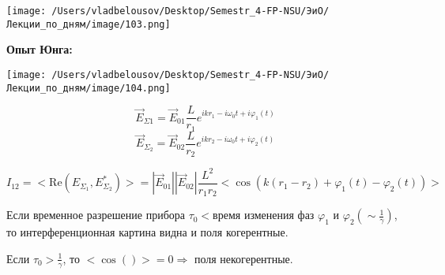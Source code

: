 \documentclass[12pt, a4paper]{report}
\begin{document}
\begin{center}
    \texttt{[image: /Users/vladbelousov/Desktop/Semestr\_4-FP-NSU/ЭиО/Лекции\_по\_дням/image/103.png]}
\end{center} 

\textbf{Опыт Юнга: } 

\begin{center}
    \texttt{[image: /Users/vladbelousov/Desktop/Semestr\_4-FP-NSU/ЭиО/Лекции\_по\_дням/image/104.png]}
\end{center} 

\[ \vec{E }  _{\Sigma 1 } = \vec{E }  _{01 }  \frac{L}{r_1 } e^{ i k r_1 - i \omega_0 t + i \varphi_1 (t )}    \] 
\[ \vec{E } _{\Sigma_2 } = \vec{E }  _{02 }  \frac{L}{r_2 }e^{i k r_2 - i \omega_0 t + i \varphi_2 (t)}    \] 

\[ I_{12} =  <\mathrm{Re }  (E_{ \Sigma_1 }, E_{ \Sigma_2 }^* )   > = |\vec{E }  _{01 } | |\vec{E }_{02} |\frac{L ^2 }{r_1 r_2} <\cos (k(r_1 -r_2 )+ \varphi_1 (t ) - \varphi_2 (t))>   \] 

Если временное разрешение прибора \( \tau_0< \)время  изменения фаз \( \varphi_1 \text{ и  } \varphi_2  \left( \sim \displaystyle \frac{1}{\gamma}  \right) \), то интерференционная картина видна и поля когерентные. 

Если \( \tau_0 > \displaystyle \frac{1}{\gamma}  \), то \( <\cos ()>  = 0 \Rightarrow \) поля некогерентные.


\ifdefined\mainfile
\else
    
\end{document}
